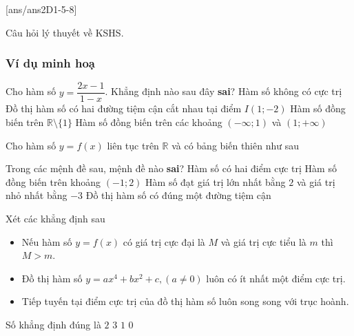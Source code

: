 [ans/ans2D1-5-8]
\begin{dang}{Câu hỏi lý thuyết về KSHS}.
\end{dang}
\subsubsection{Ví dụ minh hoạ}
\begin{vd}%
	Cho hàm số $y=\dfrac{2x-1}{1-x}$. Khẳng định nào sau đây \textbf{sai}?
	\choice
	{Hàm số không có cực trị}
	{Đồ thị hàm số có hai đường tiệm cận cắt nhau tại điểm $I(1;-2)$}
	{\True Hàm số đồng biến trên $\mathbb{R}\setminus \{1\}$}
	{Hàm số đồng biến trên các khoảng $(-\infty;1)$ và $(1;+\infty)$}
\end{vd}
\begin{vd}%
	Cho hàm số $y=f(x)$ liên tục trên $\mathbb{R}$ và có bảng biến thiên như sau
	\begin{center}
	\end{center}
	Trong các mệnh đề sau, mệnh đề nào \textbf{sai}?
	\choice
	{Hàm số có hai điểm cực trị}
	{Hàm số đồng biến trên khoảng $(-1;2)$}
	{\True Hàm số đạt giá trị lớn nhất bằng $2$ và giá trị nhỏ nhất bằng $-3$}
	{Đồ thị hàm số có đúng một đường tiệm cận}
\end{vd}
\begin{vd}%
	Xét các khẳng định sau
	\begin{itemize}
		\item Nếu hàm số $y=f(x)$ có giá trị cực đại là $M$ và giá trị cực tiểu là $m$ thì $M>m$.
		\item Đồ thị hàm số $y=ax^4+bx^2+c,(a\neq 0)$ luôn có ít nhất một điểm cực trị.
		\item Tiếp tuyến tại điểm cực trị của đồ thị hàm số luôn song song với trục hoành.
	\end{itemize}
	Số khẳng định đúng là 
	\choice
	{ $2$}
	{$3$}
	{\True $1$}
	{$0$}
\end{vd}

